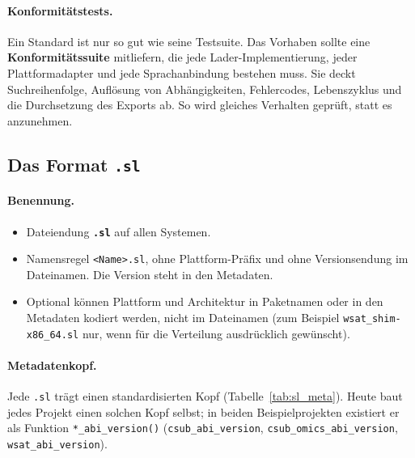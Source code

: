 \paragraph{Konformitätstests.} Ein Standard ist nur so gut wie seine Testsuite. Das Vorhaben sollte eine \textbf{Konformitätssuite} mitliefern, die jede Lader-Implementierung, jeder Plattformadapter und jede Sprachanbindung bestehen muss. Sie deckt Suchreihenfolge, Auflösung von Abhängigkeiten, Fehlercodes, Lebenszyklus und die Durchsetzung des Exports ab. So wird gleiches Verhalten geprüft, statt es anzunehmen.

\subsection{Das Format \texttt{.sl}}
\label{sec:sl_format}

\paragraph{Benennung.}

\begin{itemize}
	\item Dateiendung \textbf{\texttt{.sl}} auf allen Systemen.
	\item Namensregel \texttt{<Name>.sl}, ohne Plattform-Präfix und ohne Versionsendung im Dateinamen. Die Version steht in den Metadaten.
	\item Optional können Plattform und Architektur in Paketnamen oder in den Metadaten kodiert werden, nicht im Dateinamen (zum Beispiel \texttt{wsat\_shim-x86\_64.sl} nur, wenn für die Verteilung ausdrücklich gewünscht).
\end{itemize}

\paragraph{Metadatenkopf.} Jede \texttt{.sl} trägt einen standardisierten Kopf (Tabelle~\ref{tab:sl_meta}). Heute baut jedes Projekt einen solchen Kopf selbst; in beiden Beispielprojekten existiert er als Funktion \texttt{*\_abi\_version()} (\texttt{csub\_abi\_version}, \texttt{csub\_omics\_abi\_version}, \texttt{wsat\_abi\_version}).


